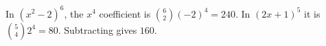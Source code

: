 In $(x^2-2)^6$, the $x^4$ coefficient is $\binom62(-2)^4=240$. In $(2x+1)^5$ it is $\binom54 2^4=80$. Subtracting gives $\boxed{160}$.
